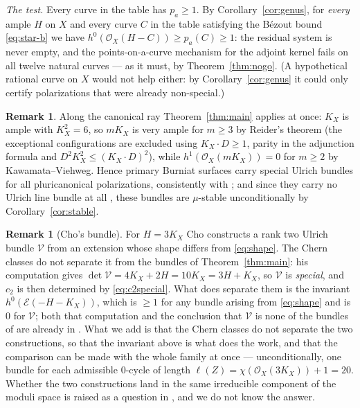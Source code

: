 \documentclass{amsart}
\theoremstyle{definition}
\newtheorem{remark}[theorem]{Remark}
\newcommand{\OO}{\mathcal{O}}
\newcommand{\EE}{\mathcal{E}}
\newcommand{\len}{\ell}
\begin{document}
\smallskip
\noindent \emph{The test.} Every curve in the table has $p_a\ge1$. By Corollary~\ref{cor:genus}, for \emph{every} ample $H$ on $X$ and every curve $C$ in the table satisfying the B\'ezout bound \eqref{eq:star-b} we have $h^0(\OO_X(H-C))\ge p_a(C)\ge1$: the residual system is never empty, and the points-on-a-curve mechanism for the adjoint kernel fails on all twelve natural curves --- as it must, by Theorem~\ref{thm:nogo}. (A hypothetical rational curve on $X$ would not help either: by Corollary~\ref{cor:genus} it could only certify polarizations that were already non-special.)

\begin{remark}\label{rem:burniat-positive}
Along the canonical ray Theorem~\ref{thm:main} applies at once: $K_X$ is ample with $K_X^2=6$, so $mK_X$ is very ample for $m\ge3$ by Reider's theorem (the exceptional configurations are excluded using $K_X\cdot D\ge1$, parity in the adjunction formula and $D^2K_X^2\le(K_X\cdot D)^2$), while $h^1(\OO_X(mK_X))=0$ for $m\ge2$ by Kawamata--Viehweg. Hence primary Burniat surfaces carry special Ulrich bundles for all pluricanonical polarizations, consistently with \cite{Cas22}; and since they carry no Ulrich line bundle at all \cite{Cho26}, these bundles are $\mu$-stable unconditionally by Corollary~\ref{cor:stable}.
\end{remark}

\begin{remark}[Cho's bundle]\label{rem:cho}
For $H=3K_X$ Cho \cite[Thm.~5.6]{Cho26} constructs a rank two Ulrich bundle $\mathcal{V}$ from an extension whose shape differs from \eqref{eq:shape}. The Chern classes do not separate it from the bundles of Theorem~\ref{thm:main}: his computation gives $\det\mathcal{V}=4K_X+2H=10K_X=3H+K_X$, so $\mathcal{V}$ is \emph{special}, and $c_2$ is then determined by \eqref{eq:c2special}. What does separate them is the invariant $h^0(\EE(-H-K_X))$, which is $\ge1$ for any bundle arising from \eqref{eq:shape} and is $0$ for $\mathcal{V}$; both that computation and the conclusion that $\mathcal V$ is none of the bundles of \cite{Cas17} are already in \cite[Rem.~5.7]{Cho26}. What we add is that the Chern classes do not separate the two constructions, so that the invariant above is what does the work, and that the comparison can be made with the whole family at once --- unconditionally, one bundle for each admissible $0$-cycle of length $\len(Z)=\chi(\OO_X(3K_X))+1=20$. Whether the two constructions land in the same irreducible component of the moduli space is raised as a question in \cite[Rem.~5.7]{Cho26}, and we do not know the answer.
\end{remark}
\end{document}
